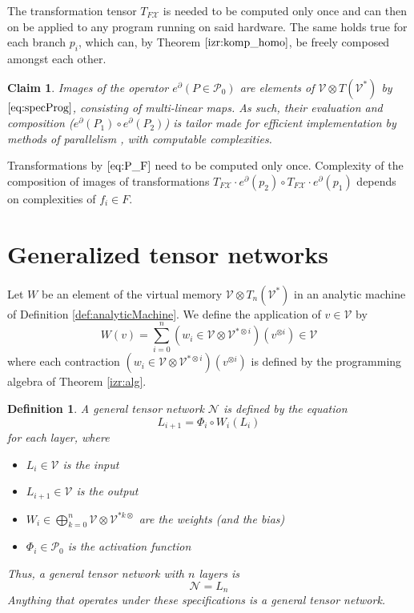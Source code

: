 \documentclass[smallcondensed]{svjour3}
\newcommand{\VV}{\mathcal{V}}
\newcommand{\NN}{\mathcal{N}}
\newcommand{\X}{\mathcal{X}}
\newcommand{\dP}{\mathcal{P}}
\newcommand{\D}{\partial}
\newtheorem{definicija}{Definition}[section]
\newtheorem{trditev}{Claim}[section]
\begin{document}
The transformation tensor $T_{F\X}$ is needed to be computed only once and can then on be applied to any program running on said hardware. The same holds true for each branch $p_i$, which can, by Theorem $\ref{izr:komp_homo}$, be freely composed amongst each other.

\begin{trditev}\label{clm:paralel}
Images of the operator $e^\D (P\in\dP_0)$ are elements of $\VV\otimes T(\VV^*)$ by $\eqref{eq:specProg}$, consisting of multi-linear maps. As such, their evaluation and composition ($e^\D(P_1)\circ e^\D(P_2)$) is tailor made for efficient implementation by methods of parallelism \cite{TensorGPU}, with computable complexities.
\end{trditev}

Transformations by $\eqref{eq:P_F}$ need to be computed only once. Complexity of the composition of images of transformations $T_{F\X}\cdot e^\D(p_2)\circ T_{F\X}\cdot e^\D(p_1)$ depends on complexities of $f_i\in F$.

\section{Generalized tensor networks}\label{sec:generalTensorNet}

Let $W$ be an element of the virtual memory $\VV\otimes T_n(\VV^*)$ in an analytic machine of Definition \ref{def:analyticMachine}. We define the application of $v\in \VV$ by
\begin{equation}
W(v)=\sum\limits_{i=0}^n(w_i\in \VV\otimes \VV^{*\otimes i})(v^{\otimes i})\in \VV
\end{equation}
where each contraction $(w_i\in \VV\otimes \VV^{*\otimes i})(v^{\otimes i})$ is defined by the programming algebra of Theorem \ref{izr:alg}.

\begin{definicija}
A general tensor network $\NN$ is defined by the equation
\begin{equation}
L_{i+1}=\Phi_i\circ W_i(L_i)
\end{equation}
for each layer, where
\begin{itemize}
\item
$L_i\in \VV$ is the input
\item
$L_{i+1}\in \VV$ is the output
\item
$W_i\in \bigoplus\limits_{k=0}^n\VV\otimes \VV^{*k\otimes}$ are the weights (and the bias)
\item
$\Phi_i\in\dP_0$ is the activation function
\end{itemize}
Thus, a general tensor network with $n$ layers is
\begin{equation}
\NN=L_n
\end{equation}
Anything that operates under these specifications is a general tensor network.
\end{definicija}
\end{document}
